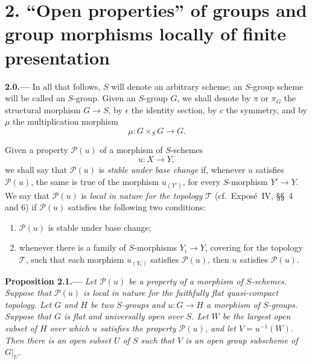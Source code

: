 
\section*{2. ``Open properties'' of groups and group morphisms
  locally of finite presentation}
\label{sec:sga3-VIB-2}

\medskip
{}\label{par:sga3-VIB-2.0}%
\noindent\textbf{2.0.---}
In all that follows, \(S\) will denote an arbitrary scheme; an
\(S\)-group scheme will be called an \(S\)-group. Given an
\(S\)-group \(G\), we shall denote by \(\pi\) or \(\pi_G\) the structural
morphism \(G\to S\), by \(\epsilon\) the identity section, by \(c\) the
symmetry, and by \(\mu\) the multiplication morphism
\[
  \mu:G\times_S G\longrightarrow G.
\]

Given a property \(\mathscr P(u)\) of a morphism of \(S\)-schemes
\[
  u:X\longrightarrow Y,
\]
we shall say that \(\mathscr P(u)\) is \emph{stable under base
change} if, whenever \(u\) satisfies \(\mathscr P(u)\), the same is
true of the morphism \(u_{(Y')}\), for every \(S\)-morphism
\(Y'\to Y\). We say that \(\mathscr P(u)\) is \emph{local in
nature for the topology \(\mathcal T\)}
(cf.\ Expos\'e~IV, \S\S~4 and 6) if \(\mathscr P(u)\) satisfies the
following two conditions:
\begin{enumerate}
\item[\textup{a)}] \(\mathscr P(u)\) is stable under base change;
\item[\textup{b)}] whenever there is a family of \(S\)-morphisms
  \(Y_i\to Y\), covering for the topology \(\mathcal T\), such
  that each morphism \(u_{(Y_i)}\) satisfies \(\mathscr P(u)\),
  then \(u\) satisfies \(\mathscr P(u)\).
\end{enumerate}

\medskip
{}\label{prop:sga3-VIB-2.1}%
\noindent\textbf{Proposition 2.1.---}
\emph{Let \(\mathscr P(u)\) be a property of a morphism of
\(S\)-schemes. Suppose that \(\mathscr P(u)\) is local in nature for the
faithfully flat quasi-compact topology. Let \(G\) and \(H\) be two
\(S\)-groups and \(u:G\to H\) a morphism of \(S\)-groups. Suppose that
\(G\) is flat and universally open over \(S\). Let \(W\) be the largest
open subset of \(H\) over which \(u\) satisfies the property
\(\mathscr P(u)\), and let \(V=u^{-1}(W)\). Then there is an open subset
\(U\) of \(S\) such that \(V\) is an open group subscheme of
\(G|_U\).}

